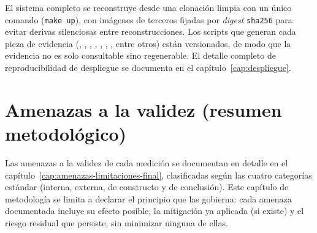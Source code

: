 El sistema completo se reconstruye desde una clonaci\'on limpia con un
\'unico comando (\texttt{make up}), con im\'agenes de terceros fijadas por
\emph{digest} \texttt{sha256} para evitar derivas silenciosas entre
reconstrucciones. Los scripts que generan cada pieza de evidencia
(,
, ,
, ,
, , entre
otros) est\'an versionados, de modo que la evidencia no es solo consultable
sino regenerable. El detalle completo de reproducibilidad de despliegue se
documenta en el cap\'itulo~\ref{cap:despliegue}.

\section{Amenazas a la validez (resumen metodol\'ogico)}

Las amenazas a la validez de cada medici\'on se documentan en detalle en
el cap\'itulo~\ref{cap:amenazas-limitaciones-final}, clasificadas seg\'un
las cuatro categor\'ias est\'andar (interna, externa, de constructo y de
conclusi\'on). Este cap\'itulo de metodolog\'ia se limita a declarar el
principio que las gobierna: cada amenaza documentada incluye su efecto
posible, la mitigaci\'on ya aplicada (si existe) y el riesgo residual que
persiste, sin minimizar ninguna de ellas.
